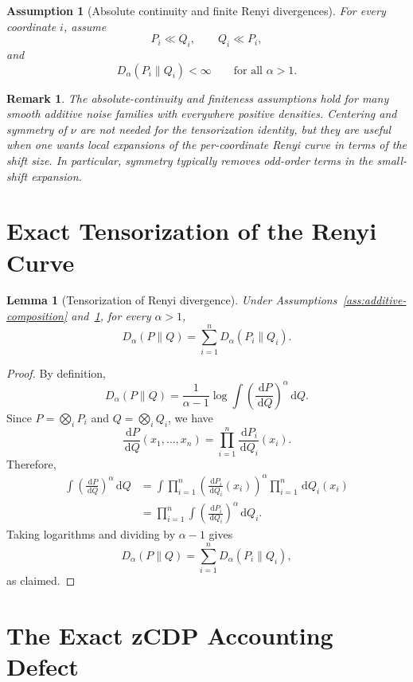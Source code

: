 \documentclass[11pt]{article}
\newtheorem{lemma}{Lemma}
\newtheorem{assumption}{Assumption}
\newtheorem{remark}{Remark}
\newcommand{\dd}{\,\mathrm d}
\begin{document}
\begin{assumption}[Absolute continuity and finite Renyi divergences]
\label{ass:regularity}
For every coordinate \(i\), assume
\[
P_i\ll Q_i,
\qquad
Q_i\ll P_i,
\]
and
\[
D_\alpha(P_i\|Q_i)<\infty
\qquad
\text{for all } \alpha>1.
\]
\end{assumption}

\begin{remark}
The absolute-continuity and finiteness assumptions hold for many smooth additive
noise families with everywhere positive densities. Centering and symmetry of
\(\nu\) are not needed for the tensorization identity, but they are useful when
one wants local expansions of the per-coordinate Renyi curve in terms of the
shift size. In particular, symmetry typically removes odd-order terms in the
small-shift expansion.
\end{remark}

\section{Exact Tensorization of the Renyi Curve}

\begin{lemma}[Tensorization of Renyi divergence]
\label{lem:tensorization}
Under Assumptions~\ref{ass:additive-composition} and~\ref{ass:regularity}, for
every \(\alpha>1\),
\[
D_\alpha(P\|Q)
=
\sum_{i=1}^n D_\alpha(P_i\|Q_i).
\]
\end{lemma}

\begin{proof}
By definition,
\[
D_\alpha(P\|Q)
=
\frac{1}{\alpha-1}
\log \int
\left(\frac{\dd P}{\dd Q}\right)^\alpha \dd Q.
\]
Since \(P=\bigotimes_i P_i\) and \(Q=\bigotimes_i Q_i\), we have
\[
\frac{\dd P}{\dd Q}(x_1,\dots,x_n)
=
\prod_{i=1}^n \frac{\dd P_i}{\dd Q_i}(x_i).
\]
Therefore,
\[
\begin{aligned}
\int
\left(\frac{\dd P}{\dd Q}\right)^\alpha \dd Q
&=
\int
\prod_{i=1}^n
\left(\frac{\dd P_i}{\dd Q_i}(x_i)\right)^\alpha
\prod_{i=1}^n \dd Q_i(x_i) \\
&=
\prod_{i=1}^n
\int
\left(\frac{\dd P_i}{\dd Q_i}\right)^\alpha \dd Q_i.
\end{aligned}
\]
Taking logarithms and dividing by \(\alpha-1\) gives
\[
D_\alpha(P\|Q)
=
\sum_{i=1}^n D_\alpha(P_i\|Q_i),
\]
as claimed.
\end{proof}

\section{The Exact zCDP Accounting Defect}
\end{document}
